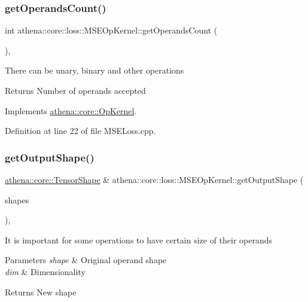 \subsubsection{\texorpdfstring{get\+Operands\+Count()}{getOperandsCount()}}
{\footnotesize\ttfamily int athena\+::core\+::loss\+::\+M\+S\+E\+Op\+Kernel\+::get\+Operands\+Count (\begin{DoxyParamCaption}{ }\end{DoxyParamCaption})\hspace{0.3cm}{\ttfamily [override]}, {\ttfamily [virtual]}}

There can be unary, binary and other operations \begin{DoxyReturn}{Returns}
Number of operands accepted 
\end{DoxyReturn}


Implements \mbox{\hyperlink{classathena_1_1core_1_1_op_kernel_add97d4c132d80ecd9915acfedf7c9119}{athena\+::core\+::\+Op\+Kernel}}.



Definition at line 22 of file M\+S\+E\+Loss.\+cpp.

\mbox{\label{classathena_1_1core_1_1loss_1_1_m_s_e_op_kernel_a23aacffbbc73b177535511702f3c441d}} 
\subsubsection{\texorpdfstring{get\+Output\+Shape()}{getOutputShape()}}
{\footnotesize\ttfamily \mbox{\hyperlink{classathena_1_1core_1_1_tensor_shape}{athena\+::core\+::\+Tensor\+Shape}} \& athena\+::core\+::loss\+::\+M\+S\+E\+Op\+Kernel\+::get\+Output\+Shape (\begin{DoxyParamCaption}\item[{std\+::vector$<$ \mbox{\hyperlink{classathena_1_1core_1_1_tensor_shape}{athena\+::core\+::\+Tensor\+Shape}} $>$ \&}]{shapes }\end{DoxyParamCaption})\hspace{0.3cm}{\ttfamily [override]}, {\ttfamily [virtual]}}

It is important for some operations to have certain size of their operands 
\begin{DoxyParams}{Parameters}
{\em shape} & Original operand shape \\
\hline
{\em dim} & Dimensionality \\
\hline
\end{DoxyParams}
\begin{DoxyReturn}{Returns}
New shape 
\end{DoxyReturn}


